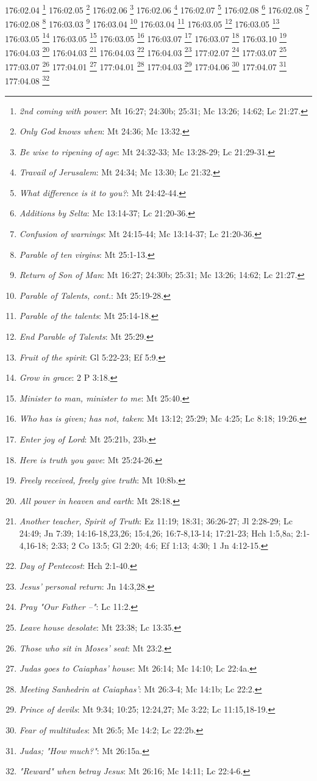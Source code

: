 176:02.04 \footnote{\textit{2nd coming with power}: Mt 16:27; 24:30b; 25:31; Mc 13:26; 14:62; Lc 21:27.}
176:02.05 \footnote{\textit{Only God knows when}: Mt 24:36; Mc 13:32.}
176:02.06 \footnote{\textit{Be wise to ripening of age}: Mt 24:32-33; Mc 13:28-29; Lc 21:29-31.}
176:02.06 \footnote{\textit{Travail of Jerusalem}: Mt 24:34; Mc 13:30; Lc 21:32.}
176:02.07 \footnote{\textit{What difference is it to you?}: Mt 24:42-44.}
176:02.08 \footnote{\textit{Additions by Selta}: Mc 13:14-37; Lc 21:20-36.}
176:02.08 \footnote{\textit{Confusion of warnings}: Mt 24:15-44; Mc 13:14-37; Lc 21:20-36.}
176:02.08 \footnote{\textit{Parable of ten virgins}: Mt 25:1-13.}
176:03.03 \footnote{\textit{Return of Son of Man}: Mt 16:27; 24:30b; 25:31; Mc 13:26; 14:62; Lc 21:27.}
176:03.04 \footnote{\textit{Parable of Talents, cont.}: Mt 25:19-28.}
176:03.04 \footnote{\textit{Parable of the talents}: Mt 25:14-18.}
176:03.05 \footnote{\textit{End Parable of Talents}: Mt 25:29.}
176:03.05 \footnote{\textit{Fruit of the spirit}: Gl 5:22-23; Ef 5:9.}
176:03.05 \footnote{\textit{Grow in grace}: 2 P 3:18.}
176:03.05 \footnote{\textit{Minister to man, minister to me}: Mt 25:40.}
176:03.05 \footnote{\textit{Who has is given; has not, taken}: Mt 13:12; 25:29; Mc 4:25; Lc 8:18; 19:26.}
176:03.07 \footnote{\textit{Enter joy of Lord}: Mt 25:21b, 23b.}
176:03.07 \footnote{\textit{Here is truth you gave}: Mt 25:24-26.}
176:03.10 \footnote{\textit{Freely received, freely give truth}: Mt 10:8b.}
176:04.03 \footnote{\textit{All power in heaven and earth}: Mt 28:18.}
176:04.03 \footnote{\textit{Another teacher, Spirit of Truth}: Ez 11:19; 18:31; 36:26-27; Jl 2:28-29; Lc 24:49; Jn 7:39; 14:16-18,23,26; 15:4,26; 16:7-8,13-14; 17:21-23; Hch 1:5,8a; 2:1-4,16-18; 2:33; 2 Co 13:5; Gl 2:20; 4:6; Ef 1:13; 4:30; 1 Jn 4:12-15.}
176:04.03 \footnote{\textit{Day of Pentecost}: Hch 2:1-40.}
176:04.03 \footnote{\textit{Jesus' personal return}: Jn 14:3,28.}
177:02.07 \footnote{\textit{Pray "Our Father --"}: Lc 11:2.}
177:03.07 \footnote{\textit{Leave house desolate}: Mt 23:38; Lc 13:35.}
177:03.07 \footnote{\textit{Those who sit in Moses' seat}: Mt 23:2.}
177:04.01 \footnote{\textit{Judas goes to Caiaphas' house}: Mt 26:14; Mc 14:10; Lc 22:4a.}
177:04.01 \footnote{\textit{Meeting Sanhedrin at Caiaphas'}: Mt 26:3-4; Mc 14:1b; Lc 22:2.}
177:04.03 \footnote{\textit{Prince of devils}: Mt 9:34; 10:25; 12:24,27; Mc 3:22; Lc 11:15,18-19.}
177:04.06 \footnote{\textit{Fear of multitudes}: Mt 26:5; Mc 14:2; Lc 22:2b.}
177:04.07 \footnote{\textit{Judas; "How much?"}: Mt 26:15a.}
177:04.08 \footnote{\textit{"Reward" when betray Jesus}: Mt 26:16; Mc 14:11; Lc 22:4-6.}
